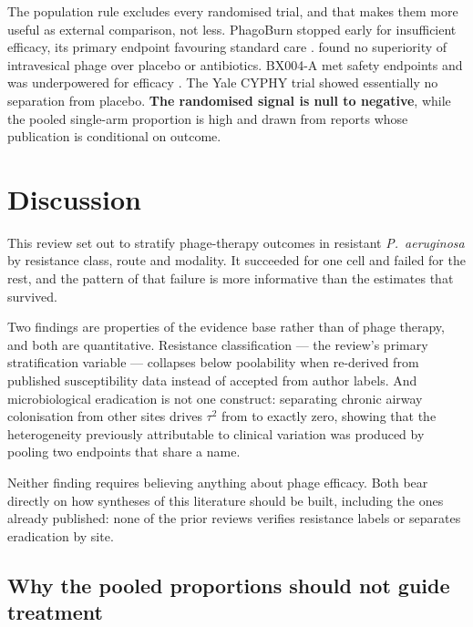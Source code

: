 \documentclass[12pt]{article}
\begin{document}
The population rule excludes every randomised trial, and that makes them more useful as external comparison, not less. PhagoBurn stopped early for insufficient efficacy, its primary endpoint favouring standard care \parencite{Jault2019_phagoburn}. \textcite{Leitner2021_lancetid_pyophage} found no superiority of intravesical phage over placebo or antibiotics. BX004-A met safety endpoints and was underpowered for efficacy \parencite{Weiner2025_natcomms}. The Yale CYPHY trial showed essentially no separation from placebo. \textbf{The randomised signal is null to negative}, while the pooled single-arm proportion is high and drawn from reports whose publication is conditional on outcome.

\section{Discussion}

This review set out to stratify phage-therapy outcomes in resistant \textit{P.\ aeruginosa} by resistance class, route and modality. It succeeded for one cell and failed for the rest, and the pattern of that failure is more informative than the estimates that survived.

Two findings are properties of the evidence base rather than of phage therapy, and both are quantitative. Resistance classification --- the review's primary stratification variable --- collapses below poolability when re-derived from published susceptibility data instead of accepted from author labels. And microbiological eradication is not one construct: separating chronic airway colonisation from other sites drives $\tau^2$ from \EradFullTau to exactly zero, showing that the heterogeneity previously attributable to clinical variation was produced by pooling two endpoints that share a name.

Neither finding requires believing anything about phage efficacy. Both bear directly on how syntheses of this literature should be built, including the ones already published: none of the prior reviews \parencite{ElHaddad2019_eskape,Uyttebroek2022_lancetid,Liu2025_ijaa} verifies resistance labels or separates eradication by site.

\subsection*{Why the pooled proportions should not guide treatment}
\end{document}
